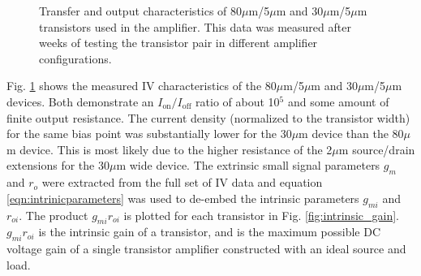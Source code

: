 \documentclass[conference]{IEEEtran}
\begin{document}
\begin{figure}[htbp]
    \quad
    \caption{Transfer and output characteristics of 80$\mu$m/5$\mu$m and 30$\mu$m/5$\mu$m transistors used in the amplifier. This data was measured after weeks of testing the transistor pair in different amplifier configurations.}
    \label{fig:ivcharacteristics}
\end{figure}

Fig. \ref{fig:ivcharacteristics} shows the measured IV characteristics of the 80$\mu$m/5$\mu$m and 30$\mu$m/5$\mu$m devices.
Both demonstrate an $I_{\text{on}}/I_{\text{off}}$ ratio of about 10$^5$ and some amount of finite output resistance.
The current density (normalized to the transistor width) for the same bias point was substantially lower for the 30$\mu$m device than the 80$\mu$m device.
This is most likely due to the higher resistance of the 2$\mu$m source/drain extensions for the 30$\mu$m wide device.
The extrinsic small signal parameters $g_{m}$ and $r_{o}$ were extracted from the full set of IV data and equation \ref{eqn:intrinicparameters} was used to de-embed the intrinsic parameters $g_{mi}$ and $r_{oi}$.
The product $g_{mi}r_{oi}$ is plotted for each transistor in Fig. \ref{fig:intrinsic_gain}. $g_{mi}r_{oi}$ is the intrinsic gain of a transistor, and is the maximum possible DC voltage gain of a single transistor amplifier constructed with an ideal source and load.

\end{document}
